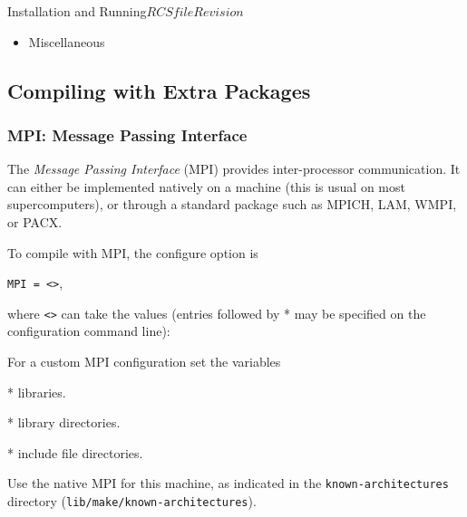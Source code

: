 \begin{cactuspart}{Installation and Running}{$RCSfile$}{$Revision$}
\begin{itemize}
\item{Miscellaneous}


\end{itemize}




\subsection{Compiling with Extra Packages}
\label{subsec:cowiexpa}


\subsubsection{MPI: Message Passing Interface}
\label{subsubsec:Compiling-MPI}

The \textit{Message Passing Interface} (MPI) provides inter-processor
communication. It can either be implemented natively on a machine
(this is usual on most supercomputers), or through a standard package
such as MPICH, LAM, WMPI, or PACX.

To compile with MPI, the configure option is

\texttt{MPI = <>},

where \texttt{<>} can take the values (entries followed by *
may be specified on the configuration command line):

\begin{Lentry}

\item[\texttt{CUSTOM}] For a custom MPI configuration set the variables
  \begin{Lentry}
  \item [\texttt{MPI\_LIBS}] * libraries.
  \item [\texttt{MPI\_LIB\_DIRS}] * library directories.
  \item [\texttt{MPI\_INC\_DIRS}] * include file directories.
  \end{Lentry}

\item[\texttt{NATIVE}] Use the native MPI for this machine, as indicated in
        the \texttt{known-architectures} directory
        (\texttt{lib/make/known-architectures}).


\end{Lentry}
\end{cactuspart}
